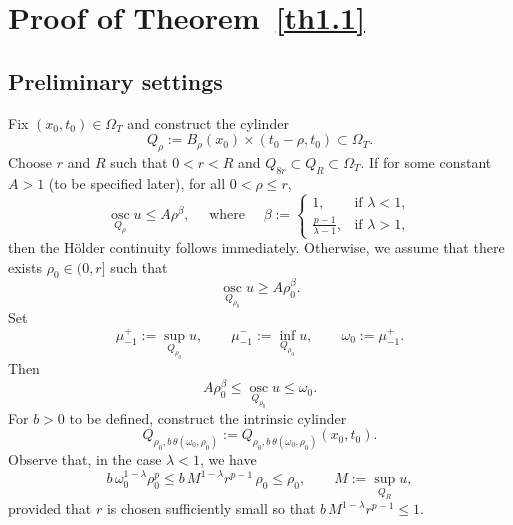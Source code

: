 \documentclass[a4paper,11pt,fullpage]{article}
\DeclareMathOperator*{\osc}{osc}
\numberwithin{equation}{section}
\begin{document}
\section{Proof of Theorem~\ref{th1.1}}

\subsection{Preliminary settings}

Fix $(x_0, t_0)\in \Omega_T$ and construct the cylinder 
\begin{equation*}
Q_{\rho}:= 
B_{\rho}(x_0) \times(t_0- \rho, t_0)\subset \Omega_T.
\end{equation*}
Choose $r$ and $R$ such that $0<r<R$ and $Q_{8r} \subset Q_{R}\subset \Omega_T$. If for some constant $A>1$ (to be specified later), for all $0<\rho\leqslant r$, 
\begin{equation*}
\osc\limits_{Q_\rho} u\leqslant A\rho^\beta,\quad \text{ where } \quad \beta:=
\begin{cases}
1,   &\text{if } \lambda<1, \\
\frac{p-1}{\lambda-1},   &\text{if } \lambda>1,
\end{cases} 
\end{equation*}
then the H\"{o}lder continuity follows immediately. Otherwise, we assume that there exists $\rho_0 \in (0, r]$ such that
\begin{equation*}
\osc\limits_{Q_{\rho_0}} u \geqslant A\rho_0^\beta.
\end{equation*}
Set 
\begin{equation*}
\mu^+_{-1}:=\sup\limits_{Q_{\rho_0}} u, \qquad
\mu^-_{-1}:=\inf\limits_{Q_{\rho_0}} u, \qquad
\omega_0:=\mu^+_{-1}.
\end{equation*}
Then
\begin{equation}\label{eq9.5}
A\rho_0^\beta\leqslant\osc\limits_{Q_{\rho_0}} u\leqslant \omega_0.
\end{equation}
For $b>0$ to be defined, construct the intrinsic cylinder
\begin{equation*}
Q_{\rho_0, b\,\theta(\omega_0, \rho_0)}:=Q_{\rho_0, b\,\theta(\omega_0, \rho_0)}(x_0, t_0).
\end{equation*}
Observe that, in the case $\lambda<1$, we have
\begin{equation*}
b\,\omega_0^{1-\lambda}\rho_0^p\leqslant b\,M^{1-\lambda}r^{p-1}\,\rho_0\leqslant \rho_0, \qquad M:=\sup_{Q_R}u,
\end{equation*}
provided that $r$ is chosen sufficiently small so that $b\,M^{1-\lambda}r^{p-1}\leqslant1$.
\end{document}
